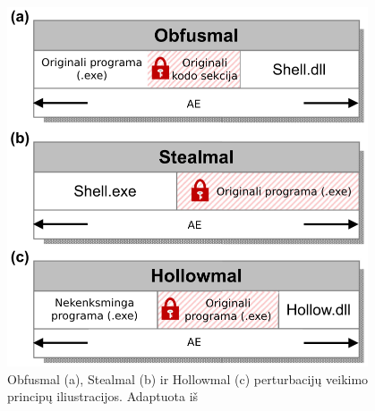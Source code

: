 \begin{figure}[h]
    \begin{small}
        \begin{center}
            \includegraphics[width=0.95\textwidth]{img/complex-perturbations.png}
        \end{center}
        \caption{Obfusmal (a), Stealmal (b) ir Hollowmal (c) perturbacijų veikimo principų iliustracijos. Adaptuota iš \cite{zhongReinforcementLearningBased2022}}\label{fig:perturbations}
    \end{small}
\end{figure}
